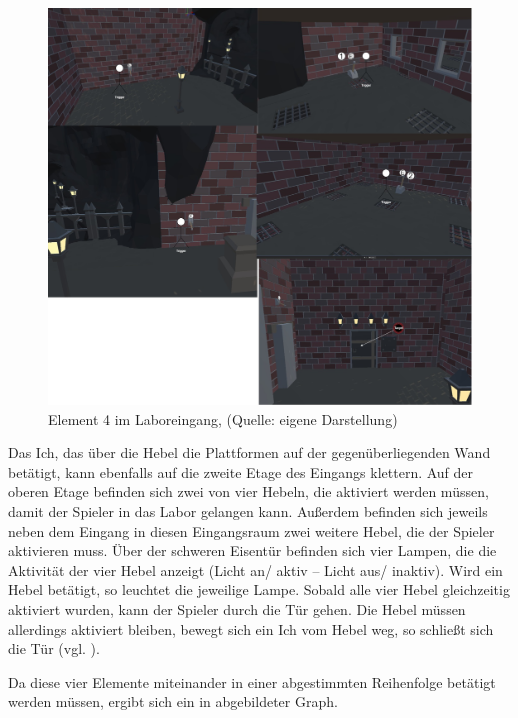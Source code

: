 \begin{figure}[ht]
\centering
\includegraphics[width=0.8\linewidth]{content/pictures/Raetsel-L02_R02_R04.jpg}
\caption{Element 4 im Laboreingang, (Quelle: eigene Darstellung)}
\label{fig:L02_R02_R04}
\end{figure}

Das Ich, das über die Hebel die Plattformen auf der gegenüberliegenden Wand betätigt, kann ebenfalls auf die zweite Etage des Eingangs klettern. Auf der oberen Etage befinden sich zwei von vier Hebeln, die aktiviert werden müssen, damit der Spieler in das Labor gelangen kann. Außerdem befinden sich jeweils neben dem Eingang in diesen Eingangsraum zwei weitere Hebel, die der Spieler aktivieren muss. Über der schweren Eisentür befinden sich vier Lampen, die die Aktivität der vier Hebel anzeigt (Licht an/ aktiv – Licht aus/ inaktiv). Wird ein Hebel betätigt, so leuchtet die jeweilige Lampe. Sobald alle vier Hebel gleichzeitig aktiviert wurden, kann der Spieler durch die Tür gehen. Die Hebel müssen allerdings aktiviert bleiben, bewegt sich ein  Ich vom Hebel weg, so schließt sich die Tür (vgl. ).

Da diese vier Elemente miteinander in einer abgestimmten Reihenfolge betätigt werden müssen, ergibt sich ein in  abgebildeter Graph.


